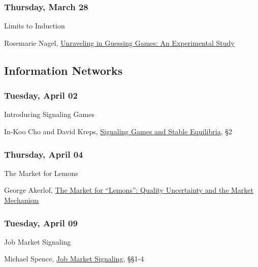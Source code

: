 \documentclass[
  12pt,
  letterpaper,
  DIV=11,
  numbers=noendperiod]{scrartcl}
\providecommand{\tightlist}{%
  \setlength{\itemsep}{0pt}\setlength{\parskip}{0pt}}\usepackage{longtable,booktabs,array}
\begin{document}
\subsubsection{Thursday, March 28}\label{thursday-march-28}

\begin{description}
\tightlist
\item[Topic]
Limits to Induction
\item[Reading]
Rosemarie Nagel, \href{https://www.jstor.org/stable/2950991}{Unraveling
in Guessing Games: An Experimental Study}
\end{description}

\subsection{Information Networks}\label{information-networks}

\subsubsection{Tuesday, April 02}\label{tuesday-april-02}

\begin{description}
\tightlist
\item[Topic]
Introducing Signaling Games
\item[Reading]
In-Koo Cho and David Kreps,
\href{https://www.jstor.org/stable/1885060}{Signaling Games and Stable
Equilibria}, §2
\end{description}

\subsubsection{Thursday, April 04}\label{thursday-april-04}

\begin{description}
\tightlist
\item[Topic]
The Market for Lemons
\item[Reading]
George Akerlof, \href{https://www.jstor.org/stable/1879431}{The Market
for ``Lemons'': Quality Uncertainty and the Market Mechanism}
\end{description}

\subsubsection{Tuesday, April 09}\label{tuesday-april-09}

\begin{description}
\tightlist
\item[Topic]
Job Market Signaling
\item[Reading]
Michael Spence, \href{https://www.jstor.org/stable/1882010}{Job Market
Signaling}, §§1-4
\end{description}
\end{document}
